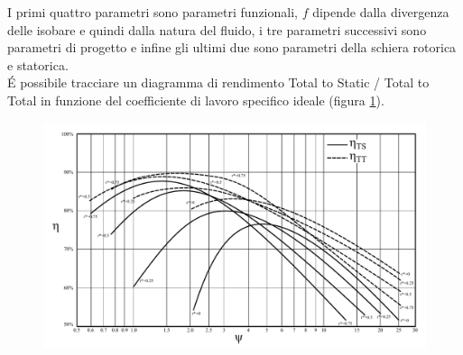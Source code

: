 I primi quattro parametri sono parametri funzionali, $f$ dipende dalla divergenza delle isobare e quindi dalla natura del fluido, i tre parametri successivi sono parametri di progetto e infine gli ultimi due sono parametri della schiera rotorica e statorica.\\
\'E possibile tracciare un diagramma di rendimento Total to Static / Total to Total in funzione del coefficiente di lavoro specifico ideale (figura \ref{fig:Rendimenti_ts_tt}). 
\begin{figure}
\centering
  \includegraphics[width=.8\textwidth]{fig/Rendimenti_ts_tt.pdf}
\caption{}
\label{fig:Rendimenti_ts_tt}
\end{figure}
